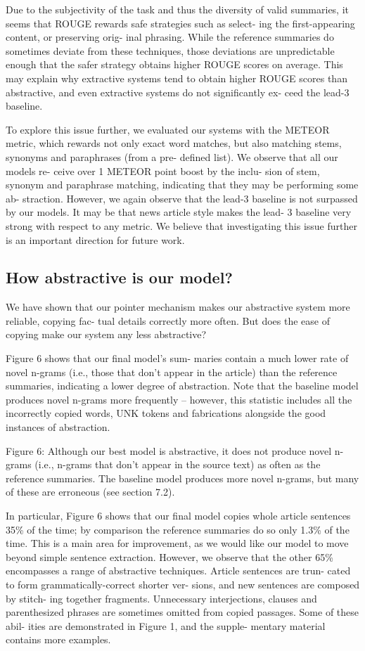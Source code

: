 \documentclass[UTF8]{ctexart}
\begin{document}
Due to the subjectivity of the task and thus
the diversity of valid summaries, it seems that
ROUGE rewards safe strategies such as select-
ing the first-appearing content, or preserving orig-
inal phrasing. While the reference summaries do
sometimes deviate from these techniques, those
deviations are unpredictable enough that the safer
strategy obtains higher ROUGE scores on average.
This may explain why extractive systems tend to
obtain higher ROUGE scores than abstractive, and
even extractive systems do not significantly ex-
ceed the lead-3 baseline.


To explore this issue further, we evaluated our
systems with the METEOR metric, which rewards
not only exact word matches, but also matching
stems, synonyms and paraphrases (from a pre-
defined list). We observe that all our models re-
ceive over 1 METEOR point boost by the inclu-
sion of stem, synonym and paraphrase matching,
indicating that they may be performing some ab-
straction. However, we again observe that the
lead-3 baseline is not surpassed by our models.
It may be that news article style makes the lead-
3 baseline very strong with respect to any metric.
We believe that investigating this issue further is
an important direction for future work.
   \subsection{How abstractive is our model?}
   We have shown that our pointer mechanism makes
our abstractive system more reliable, copying fac-
tual details correctly more often. But does the ease
of copying make our system any less abstractive?

Figure 6 shows that our final model’s sum-
maries contain a much lower rate of novel n-grams
(i.e., those that don’t appear in the article) than the
reference summaries, indicating a lower degree of
abstraction. Note that the baseline model produces
novel n-grams more frequently – however, this
statistic includes all the incorrectly copied words,
UNK tokens and fabrications alongside the good
instances of abstraction.

Figure 6: Although our best model is abstractive,
it does not produce novel n-grams (i.e., n-grams
that don’t appear in the source text) as often as
the reference summaries. The baseline model
produces more novel n-grams, but many of these
are erroneous (see section 7.2).

In particular, Figure 6 shows that our final
model copies whole article sentences 35\% of the
time; by comparison the reference summaries do
so only 1.3\% of the time. This is a main area for
improvement, as we would like our model to move
beyond simple sentence extraction. However, we
observe that the other 65\% encompasses a range of
abstractive techniques. Article sentences are trun-
cated to form grammatically-correct shorter ver-
sions, and new sentences are composed by stitch-
ing together fragments. Unnecessary interjections,
clauses and parenthesized phrases are sometimes
omitted from copied passages. Some of these abil-
ities are demonstrated in Figure 1, and the supple-
mentary material contains more examples.
\end{document}
